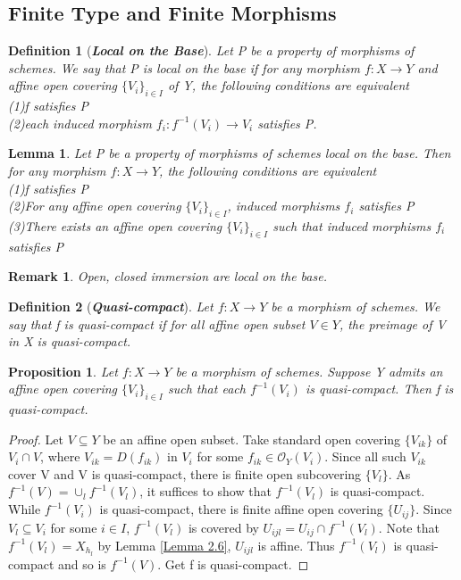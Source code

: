 \documentclass{ctexart}
\newtheorem{definition}{Definition}[section]
\newtheorem{remark}{Remark}[section]
\newtheorem{proposition}{Proposition}[section]
\newtheorem{lemma}{Lemma}[section]
\begin{document}
\subsection{Finite Type and Finite Morphisms}
\begin{definition}[\textbf{\emph{Local on the Base}}]
    Let P be a property of morphisms of schemes.
    We say that P is local on the base if for any morphism $f: X \longrightarrow Y$ and affine open covering $\{V_{i}\}_{i\in I}$ of Y,
    the following conditions are equivalent \\
    (1)f satisfies P \\
    (2)each induced morphism $f_{i}: f^{-1}(V_{i}) \longrightarrow V_{i}$ satisfies P.
\end{definition}
\begin{lemma}
    Let P be a property of morphisms of schemes local on the base.
    Then for any morphism $f: X \longrightarrow Y$, the following conditions are equivalent \\
    (1)f satisfies P \\
    (2)For any affine open covering $\{V_{i}\}_{i\in I}$, induced morphisms $f_{i}$ satisfies P \\
    (3)There exists an affine open covering $\{V_{i}\}_{i\in I}$ such that induced morphisms $f_{i}$ satisfies P
    \label{Lemma 2.9}
\end{lemma}
\begin{remark}
    Open, closed immersion are local on the base.
\end{remark}
\begin{definition}[\textbf{\emph{Quasi-compact}}]
    Let $f: X \longrightarrow Y$ be a morphism of schemes.
    We say that f is quasi-compact if for all affine open subset $V\in Y$, the preimage of V in X is quasi-compact.
\end{definition}
\begin{proposition}
    Let $f: X \longrightarrow Y$ be a morphism of schemes.
    Suppose Y admits an affine open covering $\{V_{i}\}_{i\in I}$ such that each $f^{-1}(V_{i})$ is quasi-compact.
    Then f is quasi-compact.
    \label{proposition 2.2}
\end{proposition}
\begin{proof}
    Let $V \subseteq Y$ be an affine open subset.
    Take standard open covering $\{V_{ik}\}$ of $V_{i} \cap V$, where $V_{ik} = D(f_{ik})$ in $V_{i}$ for some $f_{ik}\in \mathcal{O}_{Y}(V_{i})$.
    Since all such ${V_{ik}}$ cover V and V is quasi-compact, there is finite open subcovering $\{V_{l}\}$.
    As $f^{-1}(V) = \cup_{l} f^{-1}(V_{l})$, it suffices to show that $f^{-1}(V_{l})$ is quasi-compact.
    While $f^{-1}(V_{i})$ is quasi-compact, there is finite affine open covering $\{U_{ij}\}$.
    Since $V_{l} \subseteq V_{i}$ for some $i\in I$, $f^{-1}(V_{l})$ is covered by $U_{ijl} = U_{ij} \cap f^{-1}(V_{l})$.
    Note that $f^{-1}(V_{l}) = X_{h_{l}}$ by Lemma \ref{Lemma 2.6}, $U_{ijl}$ is affine.
    Thus $f^{-1}(V_{l})$ is quasi-compact and so is $f^{-1}(V)$.
    Get f is quasi-compact.
\end{proof}
\end{document}
